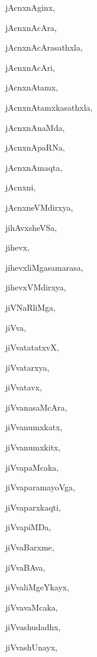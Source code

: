 \begin{multicols}{2}
{jAcnxnAginx}, \pageref{jAcnxnAginx}

{jAcnxnAcAra}, \pageref{jAcnxnAcAra}

{jAcnxnAcArasathxla}, \pageref{jAcnxnAcArasathxla}

{jAcnxnAcAri}, \pageref{jAcnxnAcAri}

{jAcnxnAtamx}, \pageref{jAcnxnAtamx}

{jAcnxnAtamxkasathxla}, \pageref{jAcnxnAtamxkasathxla}

{jAcnxnAnaMda}, \pageref{jAcnxnAnaMda}

{jAcnxnApaRNa}, \pageref{jAcnxnApaRNa}

{jAcnxnAmaqta}, \pageref{jAcnxnAmaqta}

{jAcnxni}, \pageref{jAcnxni}

{jAcnxneVMdirxya}, \pageref{jAcnxneVMdirxya}

{jihAvxsheVSa}, \pageref{jihAvxsheVSa}

{jihevx}, \pageref{jihevx}

{jihevxliMgasamarasa}, \pageref{jihevxliMgasamarasa}

{jihevxVMdirxya}, \pageref{jihevxVMdirxya}

{jiVNaRliMga}, \pageref{jiVNaRliMga}

{jiVva}, \pageref{jiVva}

{jiVvatatatxvX}, \pageref{jiVvatatatxvX}

{jiVvatarxya}, \pageref{jiVvatarxya}

{jiVvatavx}, \pageref{jiVvatavx}

{jiVvanasaMcAra}, \pageref{jiVvanasaMcAra}

{jiVvanumxkatx}, \pageref{jiVvanumxkatx}

{jiVvanumxkitx}, \pageref{jiVvanumxkitx}

{jiVvapaMcaka}, \pageref{jiVvapaMcaka}

{jiVvaparamayoVga}, \pageref{jiVvaparamayoVga}

{jiVvaparxkaqti}, \pageref{jiVvaparxkaqti}

{jiVvapiMDa}, \pageref{jiVvapiMDa}

{jiVvaBarxme}, \pageref{jiVvaBarxme}

{jiVvaBAva}, \pageref{jiVvaBAva}

{jiVvaliMgeYkayx}, \pageref{jiVvaliMgeYkayx}

{jiVvavaMcaka}, \pageref{jiVvavaMcaka}

{jiVvashudadhx}, \pageref{jiVvashudadhx}

{jiVvashUnayx}, \pageref{jiVvashUnayx}


\end{multicols}
